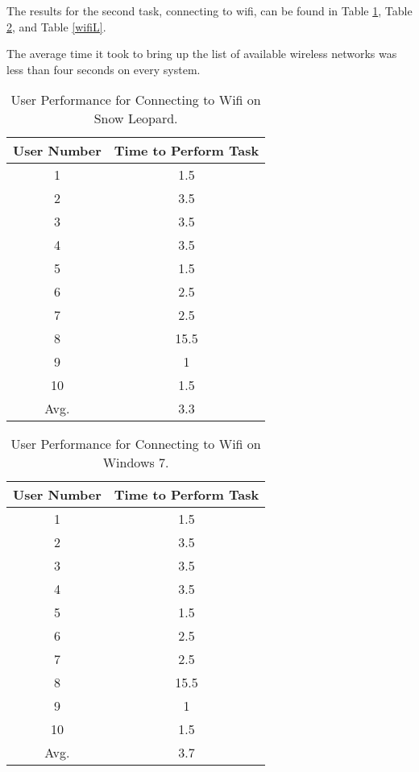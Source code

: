 \documentclass[11pt,letterpaper]{report}
\begin{document}
The results for the second task, connecting to wifi, can be found in Table \ref{wifiM}, Table \ref{wifiW}, and Table \ref{wifiL}.

The average time it took to bring up the list of available wireless networks was less than four seconds on every system. 

\begin{table}
    \centering
    \begin{tabular}{| c | c |}
        \hline
        User Number & Time to Perform Task \\ \hline
        1 & 1.5 \\  \hline
        2 & 3.5 \\  \hline
        3 & 3.5 \\ \hline
        4 & 3.5 \\  \hline
        5 & 1.5 \\    \hline
        6 & 2.5 \\  \hline
        7 & 2.5 \\ \hline
        8 & 15.5 \\  \hline
        9 & 1 \\ \hline
        10 & 1.5 \\ \hline
        Avg. & 3.3 \\
        \hline
    \end{tabular}
    \caption{User Performance for Connecting to Wifi on Snow Leopard.}
    \label{wifiM}    
\end{table}

\begin{table}
    \centering
    \begin{tabular}{| c | c |}
        \hline
        User Number & Time to Perform Task \\ \hline
        1 & 1.5 \\  \hline
        2 & 3.5 \\  \hline
        3 & 3.5 \\ \hline
        4 & 3.5 \\  \hline
        5 & 1.5 \\    \hline
        6 & 2.5 \\  \hline
        7 & 2.5 \\ \hline
        8 & 15.5 \\  \hline
        9 & 1 \\ \hline
        10 & 1.5 \\ \hline
        Avg. & 3.7 \\
        \hline
    \end{tabular}
    \caption{User Performance for Connecting to Wifi on Windows 7.}
    \label{wifiW}    
\end{table}
\end{document}
